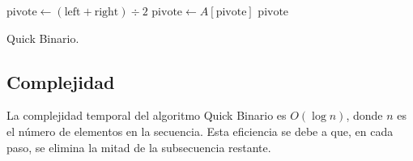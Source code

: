 \documentclass[twoside,spanish]{elsarticle}
\begin{document}
\begin{algorithm}
\begin{algorithmic}[1]

    \State {} 
  \EndIf
  \State $\text{pivote} \gets (\text{left} + \text{right}) \div 2$
  \State $\text{pivote} \gets A[\text{pivote}]$
    \State \Return $\text{pivote}$ 
    \State \Return {}
  \Else
    \State \Return {}
  \EndIf
\EndProcedure

\end{algorithmic}

\caption{Quick Binario.}
\end{algorithm}



\subsection*{Complejidad}

La complejidad temporal del algoritmo Quick Binario es \(O(\log n)\), donde \(n\) es el número de elementos en la secuencia. Esta eficiencia se debe a que, en cada paso, se elimina la mitad de la subsecuencia restante.
\end{document}
